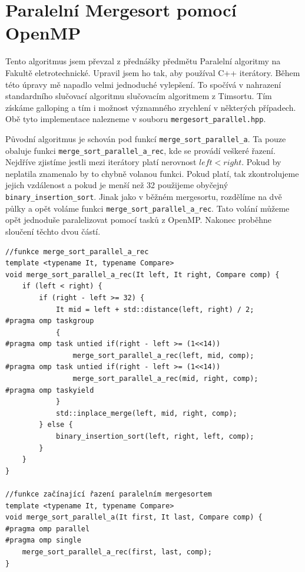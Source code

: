 \documentclass[thesis=B,czech]{FITthesis}[2019/12/23]
\begin{document}
\section{Paralelní Mergesort pomocí OpenMP}

Tento algoritmus jsem převzal z přednášky předmětu Paralelní algoritmy na Fakultě eletrotechnické. \cite{mergesortparallel}
Upravil jsem ho tak, aby používal C++ iterátory. Během této úpravy mě napadlo velmi jednoduché vylepšení. To spočívá v nahrazení standardního slučovací algoritmu slučovacím algoritmem z Timsortu. Tím získáme galloping a tím i možnost významného zrychlení v některých případech. Obě tyto implementace nalezneme v souboru \texttt{mergesort\_parallel.hpp}.

Původní algoritmus je schován pod funkcí \texttt{merge\_sort\_parallel\_a}. Ta pouze obaluje funkci \texttt{merge\_sort\_parallel\_a\_rec}, kde se provádí veškeré řazení. Nejdříve zjistíme jestli mezi iterátory platí nerovnost $ left < right $. Pokud by neplatila znamenalo by to chybně volanou funkci. Pokud platí, tak zkontrolujeme jejich vzdálenost a pokud je menší než 32 použijeme obyčejný \texttt{binary\_insertion\_sort}. Jinak jako v běžném mergesortu, rozdělíme na dvě půlky a opět voláme funkci \texttt{merge\_sort\_parallel\_a\_rec}. Tato volání můžeme opět jednoduše paralelizovat pomocí tasků z OpenMP. Nakonec proběhne sloučení těchto dvou částí.
\begin{verbatim}
//funkce merge_sort_parallel_a_rec
template <typename It, typename Compare>
void merge_sort_parallel_a_rec(It left, It right, Compare comp) {
    if (left < right) {
        if (right - left >= 32) {
            It mid = left + std::distance(left, right) / 2;
#pragma omp taskgroup
            {
#pragma omp task untied if(right - left >= (1<<14))
                merge_sort_parallel_a_rec(left, mid, comp);
#pragma omp task untied if(right - left >= (1<<14))
                merge_sort_parallel_a_rec(mid, right, comp);
#pragma omp taskyield
            }
            std::inplace_merge(left, mid, right, comp);
        } else {
            binary_insertion_sort(left, right, left, comp);
        }
    }
}

//funkce začínající řazení paralelním mergesortem
template <typename It, typename Compare>
void merge_sort_parallel_a(It first, It last, Compare comp) {
#pragma omp parallel
#pragma omp single
    merge_sort_parallel_a_rec(first, last, comp);
}


\end{verbatim}
\end{document}
